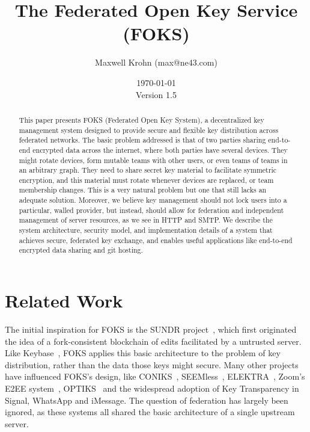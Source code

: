 \documentclass[11pt]{article}
\title{The Federated Open Key Service (FOKS)}
\author{Maxwell Krohn (max@ne43.com)}
\date{\today\\Version 1.5}
\begin{document}
\newcommand{\yubi}{Yubikey}
\newcommand{\Yubi}{Yubikey}
\newcommand{\yubis}{Yubikeys}
\newcommand{\Yubis}{Yubikeys}

\maketitle

\begin{abstract}

This paper presents FOKS (Federated Open Key System), a
decentralized key management system designed to provide secure and flexible key
distribution across federated networks. The basic problem addressed is that 
of two parties sharing end-to-end encrypted data across the internet, where both
parties have several devices. They might rotate devices, form mutable teams with
other users, or even teams of teams in an arbitrary graph. They need to share
secret key material to facilitate symmetric encryption, and this material must
rotate whenever devices are replaced, or team membership changes.  This is a
very natural problem but one that still lacks an adequate solution.  Moreover, we
believe key management should not lock users into a particular, walled provider,
but instead, should allow for federation and independent management of server
resources, as we see in HTTP and SMTP.  We describe the system architecture,
security model, and implementation details of a system that achieves secure,
federated key exchange, and enables useful applications like end-to-end
encrypted data sharing and git hosting.

\end{abstract}











\section{Related Work}

The initial inspiration for FOKS is the SUNDR project~\cite{sundr}, which first
originated the idea of a fork-consistent blockchain of edits facilitated by a
untrusted server.  Like Keybase~\cite{keybase}, FOKS applies this basic
architecture to the problem of key distribution, rather than the data those keys
might secure. Many other projects have influenced FOKS's design, like
CONIKS~\cite{melara2015coniks}, SEEMless~\cite{chase2019seemless}, 
ELEKTRA~\cite{cryptoeprint:2024/107}, Zoom's E2EE system~\cite{zoom_e2e_v4}, 
OPTIKS~\cite{cryptoeprint:2023/1515} and the widespread adoption of Key
Transparency in Signal, WhatsApp and iMessage. The question of federation has
largely been ignored, as these systems all shared the basic architecture of a
single upstream server. 
\end{document}
